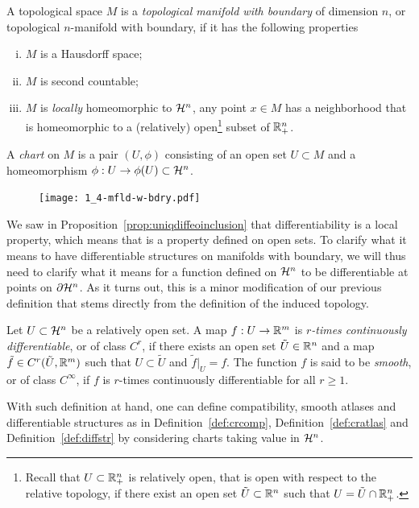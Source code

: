 \begin{defn}
  A topological space $M$ is a \emph{topological manifold with boundary} of dimension $n$, or topological $n$-manifold with boundary, if it has the following properties
  \begin{enumerate}[(i)]
    \item $M$ is a Hausdorff space;
    \item $M$ is second countable;
    \item $M$ is \emph{locally} homeomorphic to $\mathcal{H}^n$, any point $x\in M$ has a neighborhood that is homeomorphic to a (relatively) open\footnote{Recall that $U\subset\mathbb{R}^n_+$ is relatively open, that is open with respect to the relative topology, if there exist an open set $\tilde U\subset\mathbb{R}^n$ such that $U = \tilde U \cap \mathbb{R}^n_+$.} subset of $\mathbb{R}^n_+$.
  \end{enumerate}

  A \emph{chart} on $M$ is a pair $(U, \phi)$ consisting of an open set $U\subset M$ and a homeomorphism $\phi: U \to \phi(U)\subset \mathcal{H}^n$.
\end{defn}

\begin{figure}
  \texttt{[image: 1\_4-mfld-w-bdry.pdf]}
\end{figure}

We saw in Proposition~\ref{prop:uniqdiffeoinclusion} that differentiability is a local property, which means that is a property defined on open sets.
To clarify what it means to have differentiable structures on manifolds with boundary, we will thus need to clarify what it means for a function defined on $\mathcal{H}^n$ to be differentiable at points on $\partial\mathcal{H}^n$.
As it turns out, this is a minor modification of our previous definition that stems directly from the definition of the induced topology.

\begin{defn}
  Let $U\subset\mathcal{H}^n$ be a relatively open set. A map $f: U\to\mathbb{R}^m$ is \emph{$r$-times continuously differentiable}, or of class $C^r$, if there exists an open set $\tilde U\in\mathbb{R}^n$ and a map $\tilde f\in C^r(\tilde U, \mathbb{R}^m)$ such that $U\subset\tilde U$ and $\tilde f|_U = f$.
  The function $f$ is said to be \emph{smooth}, or of class $C^\infty$, if $f$ is $r$-times continuously differentiable for all $r\geq 1$.
\end{defn}

With such definition at hand, one can define compatibility, smooth atlases and differentiable structures as in Definition~\ref{def:crcomp}, Definition~\ref{def:cratlas} and Definition~\ref{def:diffstr} by considering charts taking value in $\mathcal{H}^n$.

